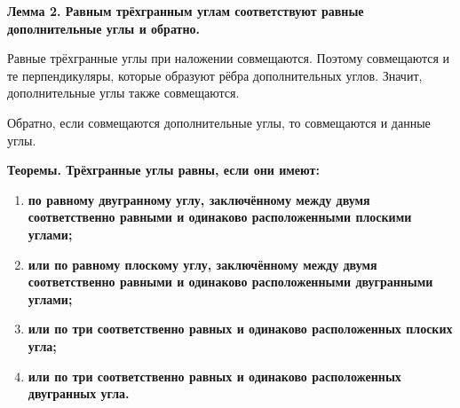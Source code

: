  \textbf{Лемма 2. Равным трёхгранным углам соответствуют равные дополнительные углы и обратно.}

Равные трёхгранные углы при наложении совмещаются. Поэтому совмещаются и те перпендикуляры, которые образуют рёбра дополнительных углов. Значит, дополнительные углы также совмещаются.

Обратно, если совмещаются дополнительные углы, то совмещаются и данные углы.

 \textbf{Теоремы. Трёхгранные углы равны, если они имеют:}

\begin{enumerate}[label=\arabic*),ref=\arabic*]
    \item \textbf{по равному двугранному углу, заключённому между двумя соответственно равными и одинаково расположенными плоскими углами;}
    \item \textbf{или по равному плоскому углу, заключённому между двумя соответственно равными и одинаково расположенными двугранными углами;}
    \item \textbf{или по три соответственно равных и одинаково расположенных плоских угла;}
    \item \textbf{или по три соответственно равных и одинаково расположенных двугранных угла.}
\end{enumerate}

